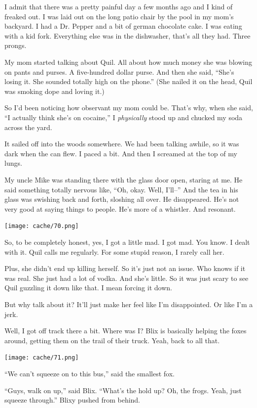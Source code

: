 \documentclass[12pt,twoside]{report}
\begin{document}
I admit that there was a pretty painful day a few months ago and I
kind of freaked out.  I was laid out on the long patio chair by the
pool in my mom's backyard.  I had a Dr. Pepper and a bit of german
chocolate cake.  I was eating with a kid fork.  Everything else was in
the dishwasher, that's all they had.  Three prongs.

My mom started talking about Quil.  All about how much money she was
blowing on pants and purses. A five-hundred dollar purse.  And then
she said, ``She's losing it. She sounded totally high on the phone.''
(She nailed it on the head, Quil was smoking dope and loving it.)

So I'd been noticing how observant my mom could be.  That's why, when
she said, ``I actually think she's on cocaine,'' I {\em physically}
stood up and chucked my soda across the yard.

It sailed off into the woods somewhere.  We had been talking awhile,
so it was dark when the can flew. I paced a bit.  And then I screamed
at the top of my lungs.

My uncle Mike was standing there with the glass door open, staring at
me.  He said something totally nervous like, ``Oh, okay.  Well,
I'll--'' And the tea in his glass was swishing back and forth,
sloshing all over.  He disappeared.  He's not very good at saying
things to people.  He's more of a whistler.  And resonant.

	\texttt{[image: cache/70.png]}

So, to be completely honest, yes, I got a little mad.  I got mad.  You
know.  I dealt with it. Quil calls me regularly.  For some stupid
reason, I rarely call her.

Plus, she didn't end up killing herself.  So it's just not an issue.
Who knows if it was real. She just had a lot of vodka.  And she's
little.  So it was just scary to see Quil guzzling it down like
that. I mean forcing it down.

But why talk about it?  It'll just make her feel like I'm
disappointed.  Or like I'm a jerk.

Well, I got off track there a bit.  Where was I?  Blix is basically
helping the foxes around, getting them on the trail of their truck.
Yeah, back to all that.

	\texttt{[image: cache/71.png]}

``We can't squeeze on to this bus,'' said the smallest fox.

``Guys, walk on up,'' said Blix.  ``What's the hold up?  Oh, the
        frogs.  Yeah, just squeeze through.'' Blixy pushed from
        behind.
\end{document}
